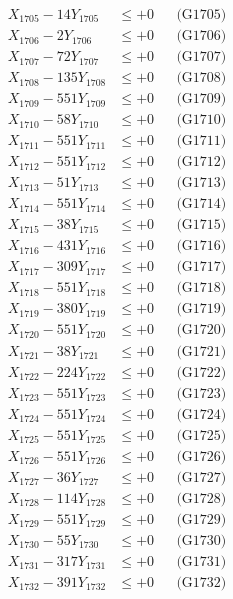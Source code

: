 \documentclass[a4paper,10pt]{article}
\begin{document}
{\begin{align}
X_{1705} - 14Y_{1705} &\leq +0 && \text{(G1705)} \\
X_{1706} - 2Y_{1706} &\leq +0 && \text{(G1706)} \\
X_{1707} - 72Y_{1707} &\leq +0 && \text{(G1707)} \\
X_{1708} - 135Y_{1708} &\leq +0 && \text{(G1708)} \\
X_{1709} - 551Y_{1709} &\leq +0 && \text{(G1709)} \\
X_{1710} - 58Y_{1710} &\leq +0 && \text{(G1710)} \\
\allowbreak
X_{1711} - 551Y_{1711} &\leq +0 && \text{(G1711)} \\
X_{1712} - 551Y_{1712} &\leq +0 && \text{(G1712)} \\
X_{1713} - 51Y_{1713} &\leq +0 && \text{(G1713)} \\
X_{1714} - 551Y_{1714} &\leq +0 && \text{(G1714)} \\
X_{1715} - 38Y_{1715} &\leq +0 && \text{(G1715)} \\
X_{1716} - 431Y_{1716} &\leq +0 && \text{(G1716)} \\
X_{1717} - 309Y_{1717} &\leq +0 && \text{(G1717)} \\
X_{1718} - 551Y_{1718} &\leq +0 && \text{(G1718)} \\
X_{1719} - 380Y_{1719} &\leq +0 && \text{(G1719)} \\
X_{1720} - 551Y_{1720} &\leq +0 && \text{(G1720)} \\
\allowbreak
X_{1721} - 38Y_{1721} &\leq +0 && \text{(G1721)} \\
X_{1722} - 224Y_{1722} &\leq +0 && \text{(G1722)} \\
X_{1723} - 551Y_{1723} &\leq +0 && \text{(G1723)} \\
X_{1724} - 551Y_{1724} &\leq +0 && \text{(G1724)} \\
X_{1725} - 551Y_{1725} &\leq +0 && \text{(G1725)} \\
X_{1726} - 551Y_{1726} &\leq +0 && \text{(G1726)} \\
X_{1727} - 36Y_{1727} &\leq +0 && \text{(G1727)} \\
X_{1728} - 114Y_{1728} &\leq +0 && \text{(G1728)} \\
X_{1729} - 551Y_{1729} &\leq +0 && \text{(G1729)} \\
X_{1730} - 55Y_{1730} &\leq +0 && \text{(G1730)} \\
\allowbreak
X_{1731} - 317Y_{1731} &\leq +0 && \text{(G1731)} \\
X_{1732} - 391Y_{1732} &\leq +0 && \text{(G1732)} \\

\end{align}}
\end{document}
